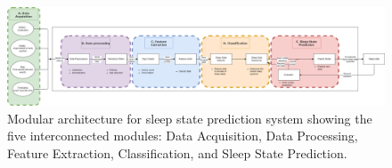 \documentclass[conference]{IEEEtran}
\begin{document}
\begin{figure}[htbp]
\centering
\includegraphics[width=\columnwidth]{system_architecture.png}
\caption{Modular architecture for sleep state prediction system showing the five interconnected modules: Data Acquisition, Data Processing, Feature Extraction, Classification, and Sleep State Prediction.}
\label{fig:architecture}
\end{figure}



\end{document}
